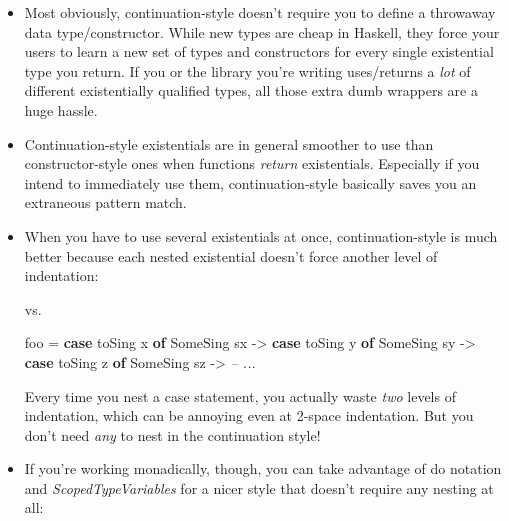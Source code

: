 \documentclass[]{article}
\newenvironment{Shaded}{}{}
\newcommand{\CommentTok}[1]{\textcolor[rgb]{0.38,0.63,0.69}{\textit{#1}}}
\newcommand{\DataTypeTok}[1]{\textcolor[rgb]{0.56,0.13,0.00}{#1}}
\newcommand{\FunctionTok}[1]{\textcolor[rgb]{0.02,0.16,0.49}{#1}}
\newcommand{\KeywordTok}[1]{\textcolor[rgb]{0.00,0.44,0.13}{\textbf{#1}}}
\newcommand{\NormalTok}[1]{#1}
\newcommand{\OtherTok}[1]{\textcolor[rgb]{0.00,0.44,0.13}{#1}}
\begin{document}
\begin{itemize}
\item
  Most obviously, continuation-style doesn't require you to define a throwaway
  data type/constructor. While new types are cheap in Haskell, they force your
  users to learn a new set of types and constructors for every single
  existential type you return. If you or the library you're writing uses/returns
  a \emph{lot} of different existentially qualified types, all those extra dumb
  wrappers are a huge hassle.
\item
  Continuation-style existentials are in general smoother to use than
  constructor-style ones when functions \emph{return} existentials. Especially
  if you intend to immediately use them, continuation-style basically saves you
  an extraneous pattern match.
\item
  When you have to use several existentials at once, continuation-style is much
  better because each nested existential doesn't force another level of
  indentation:

\begin{Shaded}
\end{Shaded}

  vs.

\begin{Shaded}
\begin{Highlighting}[]
\NormalTok{foo }\FunctionTok{=} \KeywordTok{case}\NormalTok{ toSing x }\KeywordTok{of}
        \DataTypeTok{SomeSing}\NormalTok{ sx }\OtherTok{->}
          \KeywordTok{case}\NormalTok{ toSing y }\KeywordTok{of}
            \DataTypeTok{SomeSing}\NormalTok{ sy }\OtherTok{->}
              \KeywordTok{case}\NormalTok{ toSing z }\KeywordTok{of}
                \DataTypeTok{SomeSing}\NormalTok{ sz }\OtherTok{->}
                  \CommentTok{-- ...}
\end{Highlighting}
\end{Shaded}

  Every time you nest a case statement, you actually waste \emph{two} levels of
  indentation, which can be annoying even at 2-space indentation. But you don't
  need \emph{any} to nest in the continuation style!
\item
  If you're working monadically, though, you can take advantage of do notation
  and \emph{ScopedTypeVariables} for a nicer style that doesn't require any
  nesting at all:


\end{itemize}
\end{document}

